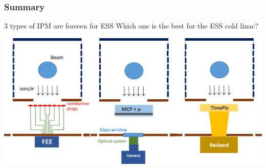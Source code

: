\begin{frame}[t]
\begin{columns}[T]
\begin{column}{0.45\textwidth}
    \end{column}
  \end{columns}

\end{frame}

\begin{frame}[t]
  \frametitle{Summary}
  \begin{block}{3 types of IPM are forseen for ESS}
    Which one is the best for the ESS cold linac?
  \end{block}
  \includegraphics[width=1\textwidth]{03_SIM/fig/fig000_recap}
\end{frame}